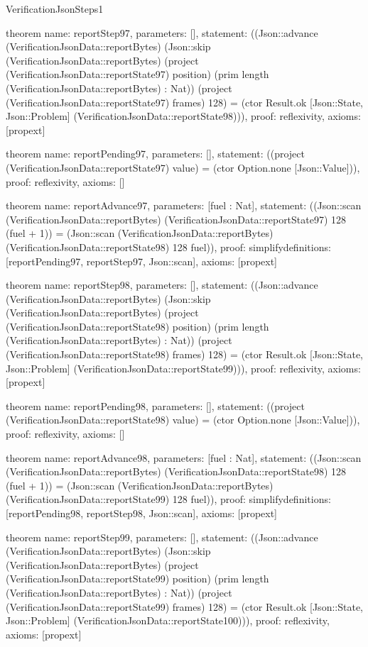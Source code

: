 \begin{lexlean}{VerificationJsonSteps1}
\begin{semanticmodule}
theorem{
  name: reportStep97,
  parameters: [],
  statement: ((Json::advance (VerificationJsonData::reportBytes) (Json::skip (VerificationJsonData::reportBytes) (project (VerificationJsonData::reportState97) position) (prim length (VerificationJsonData::reportBytes) : Nat)) (project (VerificationJsonData::reportState97) frames) 128) = (ctor Result.ok [Json::State, Json::Problem] (VerificationJsonData::reportState98))),
  proof: reflexivity{},
  axioms: [propext]
}

theorem{
  name: reportPending97,
  parameters: [],
  statement: ((project (VerificationJsonData::reportState97) value) = (ctor Option.none [Json::Value])),
  proof: reflexivity{},
  axioms: []
}

theorem{
  name: reportAdvance97,
  parameters: [fuel : Nat],
  statement: ((Json::scan (VerificationJsonData::reportBytes) (VerificationJsonData::reportState97) 128 (fuel + 1)) = (Json::scan (VerificationJsonData::reportBytes) (VerificationJsonData::reportState98) 128 fuel)),
  proof: simplify{definitions: [reportPending97, reportStep97, Json::scan]},
  axioms: [propext]
}

theorem{
  name: reportStep98,
  parameters: [],
  statement: ((Json::advance (VerificationJsonData::reportBytes) (Json::skip (VerificationJsonData::reportBytes) (project (VerificationJsonData::reportState98) position) (prim length (VerificationJsonData::reportBytes) : Nat)) (project (VerificationJsonData::reportState98) frames) 128) = (ctor Result.ok [Json::State, Json::Problem] (VerificationJsonData::reportState99))),
  proof: reflexivity{},
  axioms: [propext]
}

theorem{
  name: reportPending98,
  parameters: [],
  statement: ((project (VerificationJsonData::reportState98) value) = (ctor Option.none [Json::Value])),
  proof: reflexivity{},
  axioms: []
}

theorem{
  name: reportAdvance98,
  parameters: [fuel : Nat],
  statement: ((Json::scan (VerificationJsonData::reportBytes) (VerificationJsonData::reportState98) 128 (fuel + 1)) = (Json::scan (VerificationJsonData::reportBytes) (VerificationJsonData::reportState99) 128 fuel)),
  proof: simplify{definitions: [reportPending98, reportStep98, Json::scan]},
  axioms: [propext]
}

theorem{
  name: reportStep99,
  parameters: [],
  statement: ((Json::advance (VerificationJsonData::reportBytes) (Json::skip (VerificationJsonData::reportBytes) (project (VerificationJsonData::reportState99) position) (prim length (VerificationJsonData::reportBytes) : Nat)) (project (VerificationJsonData::reportState99) frames) 128) = (ctor Result.ok [Json::State, Json::Problem] (VerificationJsonData::reportState100))),
  proof: reflexivity{},
  axioms: [propext]
}


\end{semanticmodule}
\end{lexlean}
